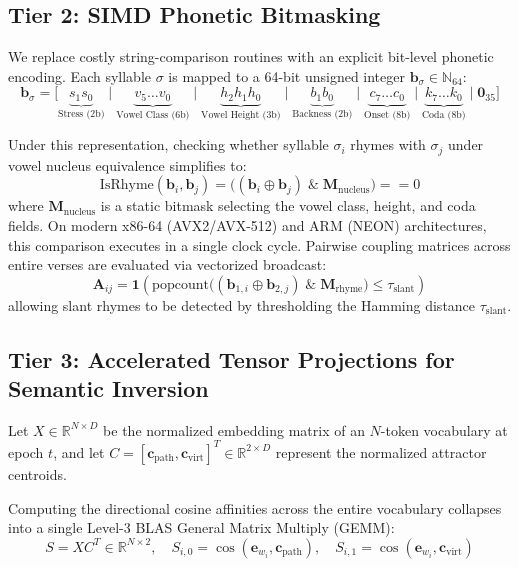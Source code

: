 \documentclass[11pt,a4paper]{article}
\begin{document}
\subsection{Tier 2: SIMD Phonetic Bitmasking}
We replace costly string-comparison routines with an explicit bit-level phonetic encoding. Each syllable $\sigma$ is mapped to a 64-bit unsigned integer $\mathbf{b}_\sigma \in \mathbb{N}_{64}$:
\begin{equation}
    \mathbf{b}_\sigma = \Big[ \underbrace{s_1 s_0}_{\text{Stress (2b)}} \;\Big|\; \underbrace{v_5 \dots v_0}_{\text{Vowel Class (6b)}} \;\Big|\; \underbrace{h_2 h_1 h_0}_{\text{Vowel Height (3b)}} \;\Big|\; \underbrace{b_1 b_0}_{\text{Backness (2b)}} \;\Big|\; \underbrace{c_7 \dots c_0}_{\text{Onset (8b)}} \;\Big|\; \underbrace{k_7 \dots k_0}_{\text{Coda (8b)}} \;\Big|\; \mathbf{0}_{35} \Big]
\end{equation}

Under this representation, checking whether syllable $\sigma_i$ rhymes with $\sigma_j$ under vowel nucleus equivalence simplifies to:
\begin{equation}
    \text{IsRhyme}(\mathbf{b}_i, \mathbf{b}_j) = \Big( (\mathbf{b}_i \oplus \mathbf{b}_j) \;\&\; \mathbf{M}_{\text{nucleus}} \Big) == 0
\end{equation}
where $\mathbf{M}_{\text{nucleus}}$ is a static bitmask selecting the vowel class, height, and coda fields. On modern x86-64 (AVX2/AVX-512) and ARM (NEON) architectures, this comparison executes in a single clock cycle. Pairwise coupling matrices across entire verses are evaluated via vectorized broadcast:
\begin{equation}
    \mathbf{A}_{ij} = \mathbf{1}\left( \text{popcount}\Big( (\mathbf{b}_{1,i} \oplus \mathbf{b}_{2,j}) \;\&\; \mathbf{M}_{\text{rhyme}} \Big) \le \tau_{\text{slant}} \right)
\end{equation}
allowing slant rhymes to be detected by thresholding the Hamming distance $\tau_{\text{slant}}$.

\subsection{Tier 3: Accelerated Tensor Projections for Semantic Inversion}
Let $X \in \mathbb{R}^{N \times D}$ be the normalized embedding matrix of an $N$-token vocabulary at epoch $t$, and let $C = [\mathbf{c}_{\text{path}}, \mathbf{c}_{\text{virt}}]^T \in \mathbb{R}^{2 \times D}$ represent the normalized attractor centroids. 

Computing the directional cosine affinities across the entire vocabulary collapses into a single Level-3 BLAS General Matrix Multiply (GEMM):
\begin{equation}
    S = X C^T \in \mathbb{R}^{N \times 2}, \quad S_{i, 0} = \cos(\mathbf{e}_{w_i}, \mathbf{c}_{\text{path}}), \quad S_{i, 1} = \cos(\mathbf{e}_{w_i}, \mathbf{c}_{\text{virt}})
\end{equation}
\end{document}
